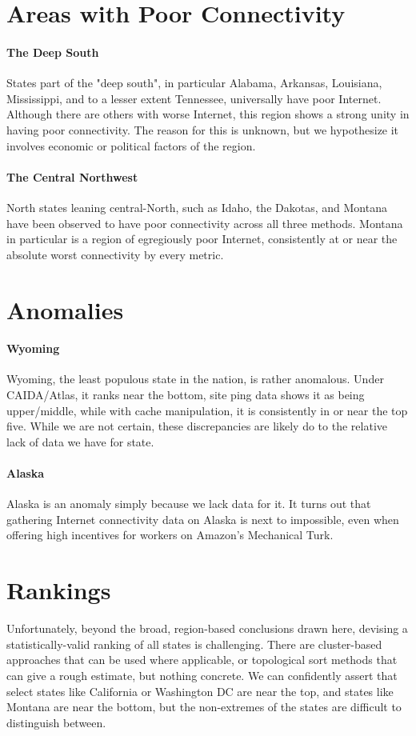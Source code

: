 \section{Areas with Poor Connectivity}

\paragraph{The Deep South} States part of the "deep south", in particular Alabama, Arkansas, Louisiana, Mississippi, and to a lesser extent Tennessee, universally have poor Internet. Although there are others with worse Internet, this region shows a strong unity in having poor connectivity. The reason for this is unknown, but we hypothesize it involves economic or political factors of the region.

\paragraph{The Central Northwest} North states leaning central-North, such as Idaho, the Dakotas, and Montana have been observed to have poor connectivity across all three methods. Montana in particular is a region of egregiously poor Internet, consistently at or near the absolute worst connectivity by every metric.

\section{Anomalies}

\paragraph{Wyoming} Wyoming, the least populous state in the nation, is rather anomalous. Under CAIDA/Atlas, it ranks near the bottom, site ping data shows it as being upper/middle, while with \dns cache manipulation, it is consistently in or near the top five. While we are not certain, these discrepancies are likely do to the relative lack of data we have for state.

\paragraph{Alaska} Alaska is an anomaly simply because we lack data for it. It turns out that gathering Internet connectivity data on Alaska is next to impossible, even when offering high incentives for workers on Amazon's Mechanical Turk.

\section{Rankings}

Unfortunately, beyond the broad, region-based conclusions drawn here, devising a statistically-valid ranking of all states is challenging. There are cluster-based approaches that can be used where applicable, or topological sort methods that can give a rough estimate, but nothing concrete. We can confidently assert that select states like California or Washington DC are near the top, and states like Montana are near the bottom, but the non-extremes of the states are difficult to distinguish between.

